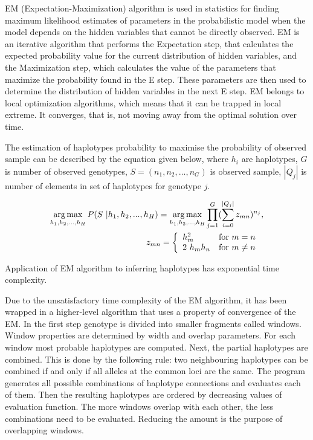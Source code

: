 \documentclass[]{spie}
\newcommand{\argmax}{\operatornamewithlimits{arg\,max}}
\begin{document}
EM (Expectation-Maximization) algorithm \cite{em}  is used in statistics for finding maximum likelihood estimates of parameters in the probabilistic model when the model depends on the hidden variables that cannot be directly observed.
EM is an iterative algorithm that performs the Expectation step, that calculates the expected probability value for the current distribution of hidden variables, and the Maximization step, which calculates the value of the parameters that maximize the probability found in the E step.
These parameters are then used to determine the distribution of hidden variables in the next E step.
EM belongs to local optimization algorithms, which means that it can be trapped in local extreme.
It converges, that is, not moving away from the optimal solution over time.

The estimation of haplotypes probability to maximise the probability of observed sample
can be described by the equation given below, where $h_{i}$ are haplotypes, $G$ is number of observed genotypes,
$S = (n_{1}, n_{2},\ldots{},n_{G})$ is observed sample, $|Q_{j}|$ is number of elements in set of haplotypes for genotype $j$.

\begin{eqnarray*}
  \argmax_{h_{1}, h_{2}, ..., h_{H}} P( S~| h_{1}, h_{2}, ..., h_{H} ) =
  \argmax_{h_{1}, h_{2}, ..., h_{H}} \prod_{j=1}^{G}(\sum_{i=0}^{|Q_{j}|}z_{mn})^{n_{j}},
  \\
  ~z_{mn} =
  \left\{
  \begin{array}{ll}
    h_{m}^2          & \mbox{for}~m = n~\\
    2~h_{m} h_{n}    & \mbox{for}~m \not = n
  \end{array}
  \right.
  \nonumber
  \label{eqZadanie}
\end{eqnarray*}

Application of EM algorithm to inferring haplotypes has exponential time complexity.

Due to the unsatisfactory time complexity of the EM algorithm, it has been wrapped in a higher-level algorithm that uses a property of convergence of the EM.
In the first step genotype is divided into smaller fragments called windows.
Window properties are determined by width and overlap parameters.
For each window most probable haplotypes are computed.
Next, the partial haplotypes are combined.
This is done by the following rule: two neighbouring haplotypes can be combined if and only if all alleles at the common loci are the same.
The program generates all possible combinations of haplotype connections and evaluates each of them.
Then the resulting haplotypes are ordered by decreasing values of evaluation function.
The more windows overlap with each other, the less combinations need to be evaluated.
Reducing the amount is the purpose of overlapping windows.
\end{document}
